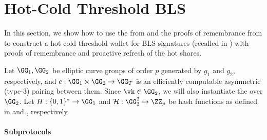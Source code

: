 \section{Hot-Cold Threshold BLS}\label{sec:bls-construction}

% 
In this section, we show how to use the \mex from  and the proofs of remembrance from  to construct a hot-cold threshold wallet for BLS signatures (recalled in ) with proofs of remembrance and proactive refresh of the hot shares. 

Let $\GG_1, \GG_2$ be elliptic curve groups of order $p$ generated by $g_1$ and $g_2$, respectively, and $e: \GG_1 \times \GG_2 \rightarrow \GG_T$ is an efficiently computable asymmetric (type-3) pairing between them. 
Since $\vk \in \GG_2$, we will also instantiate the \mex over $\GG_2$. 
Let $\blshash: \{0, 1\}^* \rightarrow \GG_1$ and $\lhlhash: \GG_2^2 \rightarrow \ZZ_p$ be hash functions as defined in  and , respectively.

\paragraph{Subprotocols}




